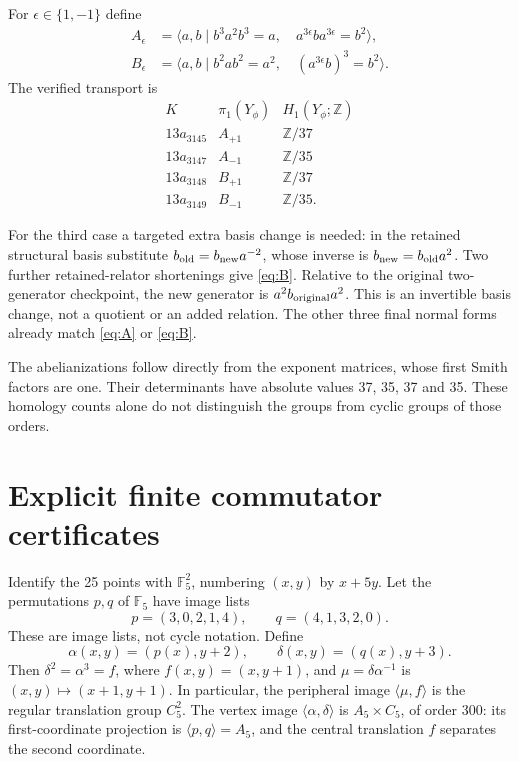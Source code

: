 \documentclass[11pt]{article}
\newcommand{\Z}{\mathbb Z}
\newcommand{\F}{\mathbb F}
\begin{document}
For $\epsilon\in\{1,-1\}$ define
\begin{align}
 A_\epsilon&=\langle a,b\mid
 b^3a^2b^3=a,\quad a^{3\epsilon}ba^{3\epsilon}=b^2\rangle,
                                                        \label{eq:A}\\
 B_\epsilon&=\langle a,b\mid
 b^2ab^2=a^2,\quad (a^{3\epsilon}b)^3=b^2\rangle.
                                                        \label{eq:B}
\end{align}
The verified transport is
\[
\begin{array}{c|c|c}
 K&\pi_1(Y_\phi)&H_1(Y_\phi;\Z)\\\hline
 13a_{3145}&A_{+1}&\Z/37\\
 13a_{3147}&A_{-1}&\Z/35\\
 13a_{3148}&B_{+1}&\Z/37\\
 13a_{3149}&B_{-1}&\Z/35.
\end{array}
\]

For the third case a targeted extra basis change is needed:
in the retained structural basis substitute
$b_{\rm old}=b_{\rm new}a^{-2}$, whose inverse is
$b_{\rm new}=b_{\rm old}a^2$. Two further retained-relator
shortenings give \eqref{eq:B}. Relative to the original
two-generator checkpoint, the new generator is
$a^2b_{\rm original}a^2$. This is an invertible basis change,
not a quotient or an added relation. The other three final
normal forms already match \eqref{eq:A} or \eqref{eq:B}.

The abelianizations follow directly from the exponent matrices,
whose first Smith factors are one. Their determinants have
absolute values 37, 35, 37 and 35. These homology counts alone
do not distinguish the groups from cyclic groups of those orders.

\section{Explicit finite commutator certificates}

Identify the 25 points with $\F_5^2$, numbering $(x,y)$ by $x+5y$.
Let the permutations $p,q$ of $\F_5$ have image lists
\[
 p=(3,0,2,1,4),\qquad q=(4,1,3,2,0).
\]
These are image lists, not cycle notation. Define
\[
 \alpha(x,y)=(p(x),y+2),\qquad
 \delta(x,y)=(q(x),y+3).
\]
Then $\delta^2=\alpha^3=f$, where $f(x,y)=(x,y+1)$, and
$\mu=\delta\alpha^{-1}$ is $(x,y)\mapsto(x+1,y+1)$.
In particular, the peripheral image $\langle\mu,f\rangle$
is the regular translation group $C_5^2$. The vertex image
$\langle\alpha,\delta\rangle$ is $A_5\times C_5$, of order 300:
its first-coordinate projection is $\langle p,q\rangle=A_5$,
and the central translation $f$ separates the second coordinate.
\end{document}
